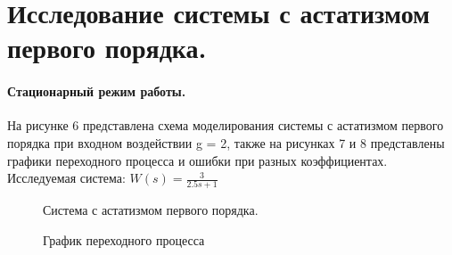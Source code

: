 \documentclass[a4paper, 11pt]{article}
\begin{document}
\newpage
\section*{Исследование системы с астатизмом первого порядка.}
\paragraph{Стационарный режим работы.}На рисунке 6 представлена схема моделирования системы с астатизмом первого порядка при входном воздействии g = 2, также на рисунках 7 и 8 представлены графики переходного процесса и ошибки при разных коэффициентах.\\
Исследуемая система: \large{$W(s)=\frac{3}{2.5s+1}$}


\begin{figure}[h!]
    \caption{Система с астатизмом первого порядка.}
    \label{one}
\end{figure}

\begin{figure}[h!]
    \caption{График переходного процесса}
    \label{two}
\end{figure}

\newpage
\end{document}
